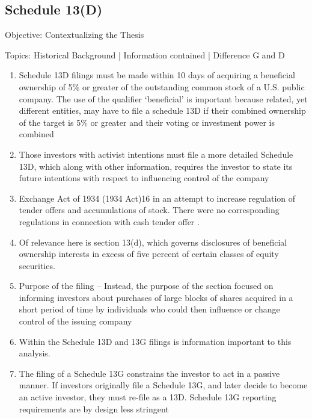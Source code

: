 \documentclass[12pt]{article}
\begin{document}
\subsection{Schedule 13(D)}
\begin{center}
Objective: Contextualizing the Thesis
\end{center}
Topics: Historical Background | Information contained | Difference G and D

	\begin{enumerate}


		\item Schedule 13D filings must be made within 10 days of acquiring a beneficial ownership of 5\% or greater of the outstanding common stock of a U.S. public company. The use of the qualifier ‘beneficial’ is important because related, yet different entities, may have to file a schedule 13D if their combined ownership of the target is 5\% or greater and their voting or investment power is combined \citep{Brigida2012}

		\item Those investors with activist intentions must file a more detailed Schedule 13D, which along with other information, requires the investor to state its future intentions with respect to influencing control of the company \citep{Giglia2018}

		\item Exchange Act of 1934 (1934 Act)16 in an attempt to increase regulation of tender offers and accumulations of stock. There were no corresponding regulations in connection with cash tender offer \citep{Giglia2018}.

        \item Of relevance here is section 13(d), which governs disclosures of beneficial ownership interests in excess of five percent of certain classes of equity securities. \citep{Giglia2018}

		\item Purpose of the filing -- Instead, the purpose of the section focused on informing investors about purchases of large blocks of shares acquired in a short period of time by individuals who could then influence or change control of the issuing company \citep{Giglia2018}
		
		\item Within the Schedule 13D and 13G filings is information important to this analysis. \citep{Brigida2012}

		\item The filing of a Schedule 13G constrains the investor to act in a passive manner. If investors originally file a Schedule 13G, and later decide to become an active investor, they must re-file as a 13D. Schedule 13G reporting requirements are by design less stringent \citep{Brigida2012}


\end{enumerate}
\end{document}
